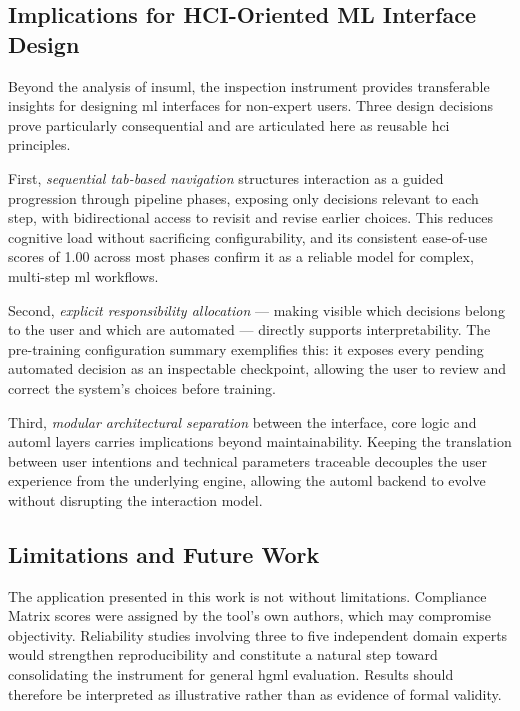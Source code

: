 \documentclass[a4paper,twoside]{article}
\begin{document}
\subsection{Implications for HCI-Oriented ML Interface Design}

Beyond the analysis of \gls{insuml}, the inspection instrument provides
transferable insights for designing \gls{ml} interfaces for non-expert users.
Three design decisions prove particularly consequential and are articulated
here as reusable \gls{hci} principles.

First, \emph{sequential tab-based navigation} structures interaction as a
guided progression through pipeline phases, exposing only decisions relevant
to each step, with bidirectional access to revisit and revise earlier choices.
This reduces cognitive load without sacrificing configurability, and its
consistent ease-of-use scores of 1.00 across most phases confirm it as a
reliable model for complex, multi-step \gls{ml} workflows.

Second, \emph{explicit responsibility allocation} --- making visible which
decisions belong to the user and which are automated --- directly supports
interpretability. The pre-training configuration summary exemplifies this:
it exposes every pending automated decision as an inspectable checkpoint,
allowing the user to review and correct the system's choices before training.

Third, \emph{modular architectural separation} between the interface,
core logic and \gls{automl} layers carries implications beyond maintainability.
Keeping the translation between user intentions and technical parameters
traceable decouples the user experience from the underlying engine, allowing
the \gls{automl} backend to evolve without disrupting the interaction model.

\subsection{Limitations and Future Work}

The application presented in this work is not without limitations. Compliance Matrix scores were assigned by the tool's own authors, which may
compromise objectivity. Reliability studies involving three to five
independent domain experts would strengthen reproducibility and constitute
a natural step toward consolidating the instrument for general \gls{hgml}
evaluation. Results should therefore be interpreted as illustrative rather
than as evidence of formal validity.
\end{document}
